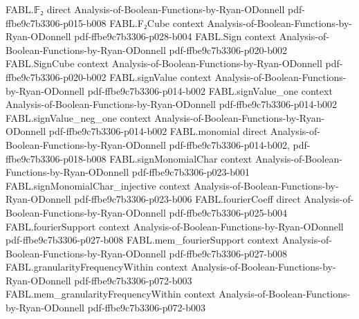 \begin{theorem}
\label{FABL.half_mismatch_le_coordinateCorrection_rejection}
\leanok
{}
\proofstep
  {FABL.𝔽₂}
  {direct}
  {Analysis-of-Boolean-Functions-by-Ryan-ODonnell}
  {pdf-ffbe9c7b3306-p015-b008}
\proofstep
  {FABL.F₂Cube}
  {context}
  {Analysis-of-Boolean-Functions-by-Ryan-ODonnell}
  {pdf-ffbe9c7b3306-p028-b004}
\proofstep
  {FABL.Sign}
  {context}
  {Analysis-of-Boolean-Functions-by-Ryan-ODonnell}
  {pdf-ffbe9c7b3306-p020-b002}
\proofstep
  {FABL.SignCube}
  {context}
  {Analysis-of-Boolean-Functions-by-Ryan-ODonnell}
  {pdf-ffbe9c7b3306-p020-b002}
\proofstep
  {FABL.signValue}
  {context}
  {Analysis-of-Boolean-Functions-by-Ryan-ODonnell}
  {pdf-ffbe9c7b3306-p014-b002}
\proofstep
  {FABL.signValue_one}
  {context}
  {Analysis-of-Boolean-Functions-by-Ryan-ODonnell}
  {pdf-ffbe9c7b3306-p014-b002}
\proofstep
  {FABL.signValue_neg_one}
  {context}
  {Analysis-of-Boolean-Functions-by-Ryan-ODonnell}
  {pdf-ffbe9c7b3306-p014-b002}
\proofstep
  {FABL.monomial}
  {direct}
  {Analysis-of-Boolean-Functions-by-Ryan-ODonnell}
  {pdf-ffbe9c7b3306-p014-b002,
    pdf-ffbe9c7b3306-p018-b008}
\proofstep
  {FABL.signMonomialChar}
  {context}
  {Analysis-of-Boolean-Functions-by-Ryan-ODonnell}
  {pdf-ffbe9c7b3306-p023-b001}
\proofstep
  {FABL.signMonomialChar_injective}
  {context}
  {Analysis-of-Boolean-Functions-by-Ryan-ODonnell}
  {pdf-ffbe9c7b3306-p023-b006}
\proofstep
  {FABL.fourierCoeff}
  {direct}
  {Analysis-of-Boolean-Functions-by-Ryan-ODonnell}
  {pdf-ffbe9c7b3306-p025-b004}
\proofstep
  {FABL.fourierSupport}
  {context}
  {Analysis-of-Boolean-Functions-by-Ryan-ODonnell}
  {pdf-ffbe9c7b3306-p027-b008}
\proofstep
  {FABL.mem_fourierSupport}
  {context}
  {Analysis-of-Boolean-Functions-by-Ryan-ODonnell}
  {pdf-ffbe9c7b3306-p027-b008}
\proofstep
  {FABL.granularityFrequencyWithin}
  {context}
  {Analysis-of-Boolean-Functions-by-Ryan-ODonnell}
  {pdf-ffbe9c7b3306-p072-b003}
\proofstep
  {FABL.mem_granularityFrequencyWithin}
  {context}
  {Analysis-of-Boolean-Functions-by-Ryan-ODonnell}
  {pdf-ffbe9c7b3306-p072-b003}
\proofstep

\end{theorem}
